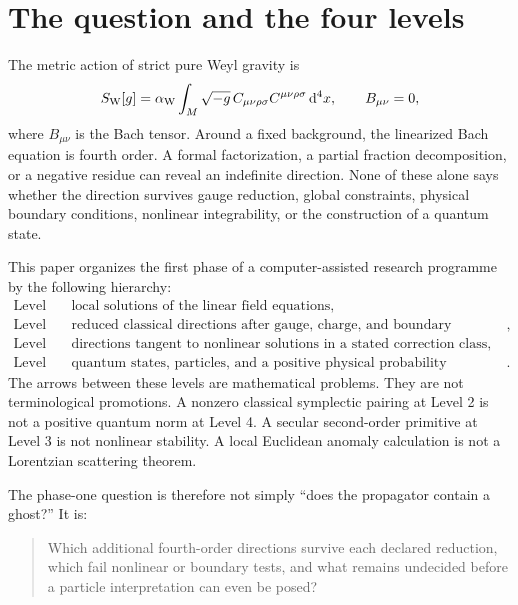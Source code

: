 \documentclass[11pt]{article}
\newcommand{\dd}{\mathrm d}
\begin{document}
\tableofcontents

\section{The question and the four levels}

The metric action of strict pure Weyl gravity is
\begin{equation}
 S_{\rm W}[g]
 =\alpha_{\rm W}\int_M \sqrt{-g}\,
 C_{\mu\nu\rho\sigma}C^{\mu\nu\rho\sigma}\,\dd^4x,
 \qquad B_{\mu\nu}=0,
 \label{eq:weyl-action}
\end{equation}
where $B_{\mu\nu}$ is the Bach tensor.  Around a fixed background, the
linearized Bach equation is fourth order.  A formal factorization, a partial
fraction decomposition, or a negative residue can reveal an indefinite
direction.  None of these alone says whether the direction survives gauge
reduction, global constraints, physical boundary conditions, nonlinear
integrability, or the construction of a quantum state.

This paper organizes the first phase of a computer-assisted research
programme by the following hierarchy:
\begin{equation}
\boxed{
\begin{array}{cl}
\text{Level 1:}&\text{local solutions of the linear field equations},\\
\text{Level 2:}&\text{reduced classical directions after gauge, charge,
and boundary conditions},\\
\text{Level 3:}&\text{directions tangent to nonlinear solutions in a stated
correction class},\\
\text{Level 4:}&\text{quantum states, particles, and a positive physical
probability interpretation}.
\end{array}}
\label{eq:four-levels}
\end{equation}
The arrows between these levels are mathematical problems.  They are not
terminological promotions.  A nonzero classical symplectic pairing at Level
2 is not a positive quantum norm at Level 4.  A secular second-order
primitive at Level 3 is not nonlinear stability.  A local Euclidean anomaly
calculation is not a Lorentzian scattering theorem.

The phase-one question is therefore not simply ``does the propagator contain
a ghost?''  It is:
\begin{quote}
Which additional fourth-order directions survive each declared reduction,
which fail nonlinear or boundary tests, and what remains undecided before a
particle interpretation can even be posed?
\end{quote}
\end{document}
